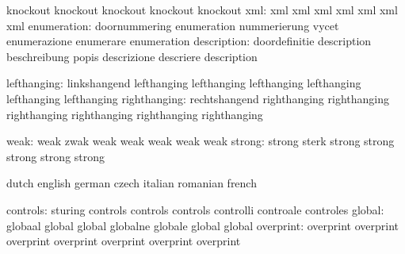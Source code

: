                            knockout                  knockout
                           knockout                  knockout
                           knockout
                      xml: xml                       xml
                           xml                       xml
                           xml                       xml
                           xml
              enumeration: doornummering             enumeration
                           nummerierung              vycet
                           enumerazione              enumerare
                           enumeration
              description: doordefinitie             description
                           beschreibung              popis
                           descrizione               descriere
                           description

              lefthanging: linkshangend              lefthanging
                           lefthanging               lefthanging
                           lefthanging               lefthanging
                           lefthanging
             righthanging: rechtshangend              righthanging
                           righthanging               righthanging
                           righthanging               righthanging
                           righthanging

                     weak: weak                       zwak
                           weak                       weak
                           weak                       weak
                           weak
                   strong: strong                     sterk
                           strong                     strong
                           strong                     strong
                           strong

\stopvariables

\startconstants            dutch                     english
                           german                    czech
                           italian                   romanian
                           french

                 controls: sturing                   controls
                           controls                  controls
                           controlli                 controale
                           controles
                   global: globaal                   global
                           global                    globalne
                           globale                   global
                           global
                overprint: overprint                 overprint
                           overprint                 overprint
                           overprint                 overprint
                           overprint

